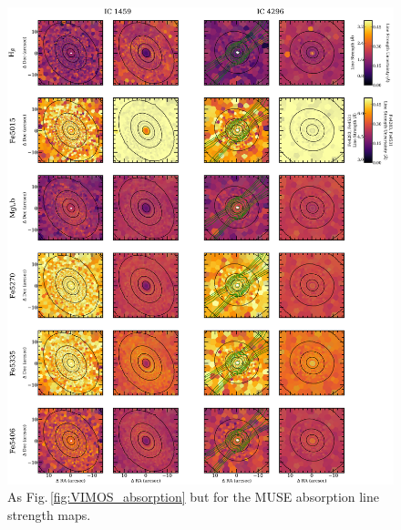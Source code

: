 		\begin{figure}
			\centering
			\includegraphics[height=0.81\textheight]{chapter4/muse/abs1.png}
			\caption[MUSE absorption line strength maps]{As Fig.\,\ref{fig:VIMOS_absorption} but for the MUSE absorption line strength maps.}%
			\label{fig:MUSE_absorption}
		\end{figure}
